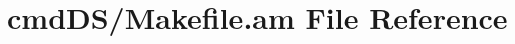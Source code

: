 \hypertarget{cmd_d_s_2_makefile_8am}{\section{cmd\+D\+S/\+Makefile.am File Reference}
\label{cmd_d_s_2_makefile_8am}
}
